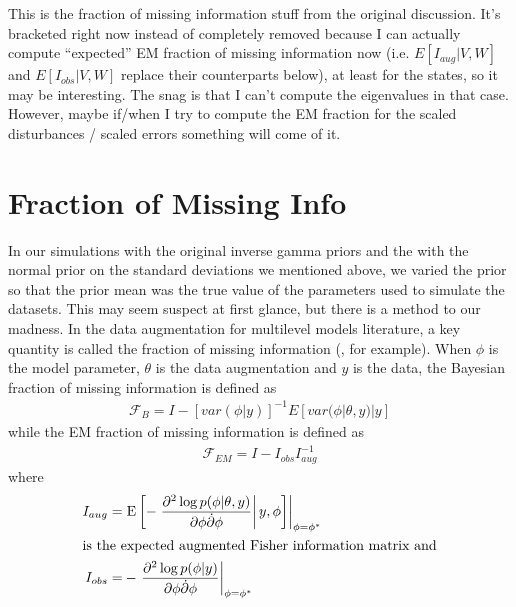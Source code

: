 \documentclass{article}
\begin{document}
This is the fraction of missing information stuff from the original discussion. It's bracketed right now instead of completely removed because I can actually compute ``expected'' EM fraction of missing information now (i.e. $E[I_{aug}|V,W]$ and $E[I_{obs}|V,W]$ replace their counterparts below), at least for the states, so it may be interesting. The snag is that I can't compute the eigenvalues in that case. However, maybe if/when I try to compute the EM fraction for the scaled disturbances / scaled errors something will come of it. 
\section{Fraction of Missing Info}
In our simulations with the original inverse gamma priors and the with the normal prior on the standard deviations we mentioned above, we varied the prior so that the prior mean was the true value of the parameters used to simulate the datasets. This may seem suspect at first glance, but there is a method to our madness. In the data augmentation for multilevel models literature, a key quantity is called the fraction of missing information (, for example). When $\phi$ is the model parameter, $\theta$ is the data augmentation and $y$ is the data, the Bayesian fraction of missing information is defined as
\begin{align*}
  \mathcal{F}_B = I - [var(\phi|y)]^{-1}E[var(\phi|\theta,y)|y]
\end{align*}
while the EM fraction of missing information is defined as
\begin{align*}
  \mathcal{F}_{EM} = I - I_{obs}I_{aug}^{-1}
\end{align*}
where 
\begin{align*}
  I_{aug}=& \left.\mathrm{E} \left[-\left.\frac{\partial^2 \log p(\phi|\theta,y)}{\partial \phi \dot \partial \phi}\right| y,\phi\right]\right|_{\phi=\phi^*}\\
  \intertext{is the expected augmented Fisher information matrix and}
  I_{obs} =& -\left.\frac{\partial^2\log p(\phi|y)}{\partial\phi \dot \partial\phi}\right|_{\phi=\phi^*}
\end{align*}
\end{document}
